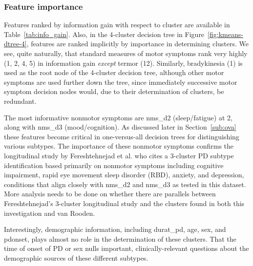 \documentclass[letterpaper,12pt]{article}
\begin{document}
\subsubsection{Feature importance}
\label{feature-importance}

Features ranked by information gain with respect to cluster are available in
Table~\ref{tab:info_gain}. Also, in the 4-cluster decision tree in
Figure~\ref{fig:kmeans-dtree-4}, features are ranked implicitly by importance
in determining clusters. We see, quite naturally, that standard measures of
motor symptoms rank very highly (1, 2, 4, 5) in information gain \emph{except}
termor (12). Similarly, bradykinesia (1) is used as the root node of the
4-cluster decision tree, although other motor symptoms are used further down
the tree, since immediately successive motor symptom decision nodes would, due
to their determination of clusters, be redundant.

The most informative nonmotor
symptoms are nms\_d2 (sleep/fatigue) at 2, along with nms\_d3
(mood/cognition). As discussed later in Section~\ref{sub:ova} these features
become critical in one-versus-all decision trees for distinguishing various
subtypes. The importance of these nonmotor symptoms confirms the longitudinal
study by Fereshtehnejad et al. \cite{fereshtehnejad15} who cites a 3-cluster PD
subtype identification based primarily on nonmotor symptoms including cognitive
impairment, rapid eye movement sleep disorder (RBD), anxiety, and depression,
conditions that align closely with nms\_d2 and nms\_d3 as tested in this
dataset. More analysis needs to be done on whether there are parallels between
Fereshtehnejad's 3-cluster longitudinal study and the clusters found in both
this investigation and van Rooden.

Interestingly, demographic information, including durat\_pd, age, sex, and
pdonset, plays almost no role in the determination of these clusters. That the
time of onset of PD or sex nulls important, clinically-relevant questions about
the demographic sources of these different subtypes.
\end{document}

